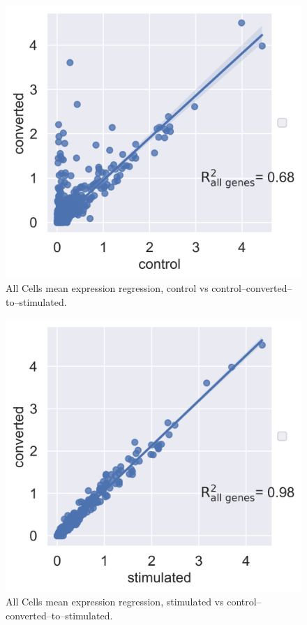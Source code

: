 \documentclass[11pt, a4paper]{report}
\theoremstyle{plain}
\theoremstyle{definition}
\theoremstyle{remark}
\begin{document}
\begin{figure}[h]
\centering
\includegraphics[width=1.1\textwidth]{images/Kang_allcells_ctrl_converted.png}
\caption{
All Cells mean expression regression, control vs
control--converted--to--stimulated.
}
\label{fig:Kang_allcells_ctrl_converted}
\end{figure}

\begin{figure}[h]
\centering
\includegraphics[width=1.1\textwidth]{images/Kang_allcells_stim_converted.png.png}
\caption{
All Cells mean expression regression, stimulated vs
control--converted--to--stimulated.
}
\label{fig:Kang_allcells_stimulated_converted}
\end{figure}
\end{document}
